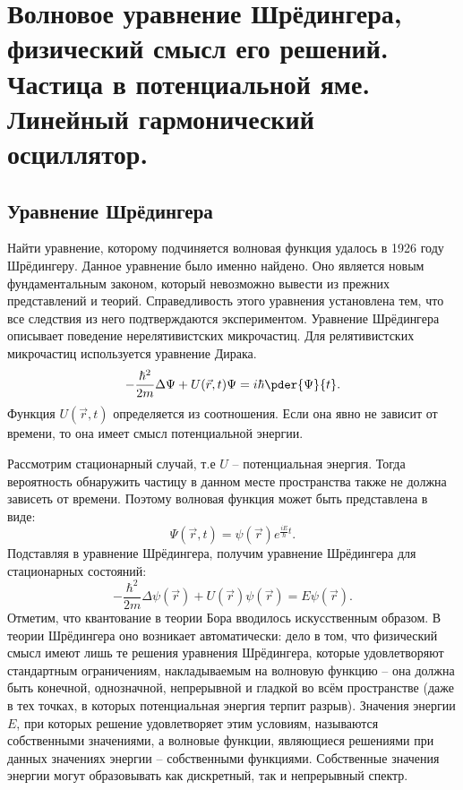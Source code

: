 \chapter{Волновое уравнение Шрёдингера, физический смысл его решений. 
Частица в потенциальной яме. Линейный гармонический осциллятор.}

\section{Уравнение Шрёдингера}
Найти уравнение, которому подчиняется волновая функция удалось в 1926 году
Шрёдингеру. Данное уравнение было именно найдено. Оно является новым
фундаментальным законом, который невозможно вывести из прежних представлений
и теорий. Справедливость этого уравнения установлена тем, что все следствия из
него подтверждаются экспериментом. Уравнение Шрёдингера описывает поведение
нерелятивистских микрочастиц. Для релятивистских микрочастиц используется
уравнение Дирака.
\[
    -\frac{\hbar^2}{2m}\Delta\Psi + U(\vec{r}, t)\Psi = i\hbar\pder{\Psi}{t}.
\]
Функция \( U(\vec{r}, t) \) определяется из соотношения. Если она явно не
зависит от времени, то она имеет смысл потенциальной энергии.

Рассмотрим стационарный случай, т.е \( U \) -- потенциальная энергия. Тогда
вероятность обнаружить частицу в данном месте пространства также не должна
зависеть от времени. Поэтому волновая функция может быть представлена в виде:
\[
    \Psi(\vec{r}, t) = \psi(\vec{r}) e^{\frac{iE}{\hbar}t}.
\]
Подставляя в уравнение Шрёдингера, получим уравнение Шрёдингера для стационарных
состояний:
\begin{equation}
    -\frac{\hbar^2}{2m}\Delta\psi(\vec{r}) + U(\vec{r})\psi(\vec{r}) =
    E\psi(\vec{r}).
\end{equation}
Отметим, что квантование в теории Бора вводилось искусственным образом. В теории
Шрёдингера оно возникает автоматически: дело в том, что физический смысл имеют
лишь те решения уравнения Шрёдингера, которые удовлетворяют стандартным
ограничениям, накладываемым на волновую функцию -- она должна быть конечной,
однозначной, непрерывной и гладкой во всём пространстве (даже в тех точках,
в которых потенциальная энергия терпит разрыв). Значения энергии \(E\),
при которых решение удовлетворяет этим условиям, называются собственными
значениями, а волновые функции, являющиеся решениями при данных значениях
энергии -- собственными функциями. Собственные значения энергии могут
образовывать как дискретный, так и непрерывный спектр.

